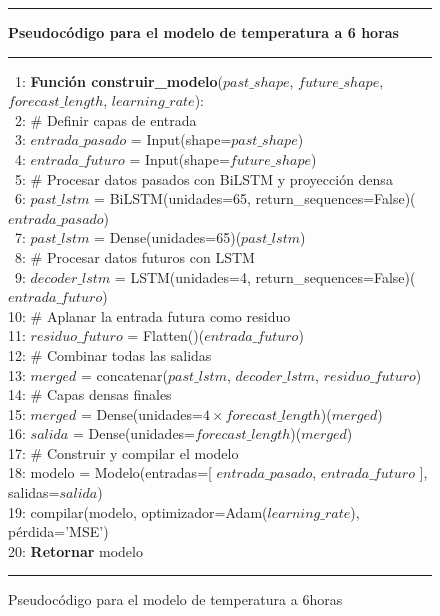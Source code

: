 \begin{figure}[H]
{\small
\hrule
{\bf\small Pseudocódigo para el modelo de temperatura a 6 horas}
\hrule
\begin{center}
\begin{tabbing}
\ 1: {\bf Fun}\={\bf ción construir\_modelo}($past\_shape$, $future\_shape$, $forecast\_length$, $learning\_rate$): \\
\ 2: \> \# Definir capas de entrada \\
\ 3: \> $entrada\_pasado$ = Input(shape=$past\_shape$) \\
\ 4: \> $entrada\_futuro$ = Input(shape=$future\_shape$) \\
\ 5: \> \# Procesar datos pasados con BiLSTM y proyección densa \\
\ 6: \> $past\_lstm$ = BiLSTM(unidades=65, return\_sequences=False)($entrada\_pasado$) \\
\ 7: \> $past\_lstm$ = Dense(unidades=65)($past\_lstm$) \\
\ 8: \> \# Procesar datos futuros con LSTM \\
\ 9: \> $decoder\_lstm$ = LSTM(unidades=4, return\_sequences=False)($entrada\_futuro$) \\
10: \> \# Aplanar la entrada futura como residuo \\
11: \> $residuo\_futuro$ = Flatten()($entrada\_futuro$) \\
12: \> \# Combinar todas las salidas \\
13: \> $merged$ = concatenar($past\_lstm$, $decoder\_lstm$, $residuo\_futuro$) \\
14: \> \# Capas densas finales \\
15: \> $merged$ = Dense(unidades=$4 \times forecast\_length$)($merged$) \\
16: \> $salida$ = Dense(unidades=$forecast\_length$)($merged$) \\
17: \> \# Construir y compilar el modelo \\
18: \> modelo = Modelo(entradas=[ $entrada\_pasado$, $entrada\_futuro$ ], salidas=$salida$) \\
19: \> compilar(modelo, optimizador=Adam($learning\_rate$), pérdida='MSE') \\
20: \> {\bf Retornar} modelo \\
\end{tabbing}
\end{center}
}
\hrule
\caption{Pseudocódigo para el modelo de temperatura a 6horas}
\label{lstm_model_temp_6h}
\end{figure}

